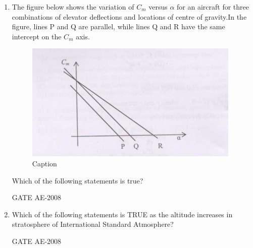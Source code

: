 \documentclass[journal,12pt,onecolumn]{IEEEtran}
\theoremstyle{remark}
\begin{document}
\begin{enumerate}
    \quad

\item The figure below shows the variation of $C_m$ versus $\alpha$ for an aircraft for three combinations of elevator deflections and locations of centre of gravity.In the figure, lines P and Q are parallel, while lines Q and R have the same intercept on the $C_m$ axis.\\

\begin{figure}
    \centering
    \includegraphics[width=0.5\linewidth]{figs/Screenshot from 2025-08-08 00-10-35.png}
    \caption{Caption}
    \label{fig:placeholder}
\end{figure}
 Which of the following statements is true?\\
    \begin{enumerate}
    \end{enumerate}
    \hfill{GATE AE-2008}

    \quad

 \item Which of the following statements is TRUE as the altitude increases in stratosphere of International Standard Atmosphere?\\
    \begin{enumerate}
    \end{enumerate}
    \hfill{GATE AE-2008}


\end{enumerate}
\end{document}
